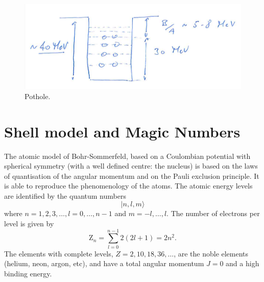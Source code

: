\begin{figure}[h]
    \centering
    \includegraphics[scale=0.3]{Figures/nuclear-physics-fig10}
    \caption{Pothole.}
    \label{nuclear-physics-fig:10}
\end{figure}

\section{Shell model and Magic Numbers}
The atomic model of Bohr-Sommerfeld, based on a Coulombian potential with spherical symmetry (with a well defined centre: the nucleus) is based on the laws of quantisation of the angular momentum and on the Pauli exclusion principle. It is able to reproduce the phenomenology of the atoms.
The atomic energy levels are identified by the quantum numbers
\begin{equation*}
    |n, l, m\rangle
\end{equation*}
where \(n = 1, 2, 3, \dots, l = 0, \dots, n-1\) and \(m = -l, \dots, l\). The number of electrons per level is given by
\begin{equation*}
    \mbox{Z}_n = \sum_{l = 0}^{n-1} 2(2l+1) = 2n^2.
\end{equation*}
The elements with complete levels, \(Z = 2, 10, 18, 36, \dots\), are the noble elements (helium, neon, argon, etc), and have a total angular momentum \(J = 0\) and a high binding energy.

